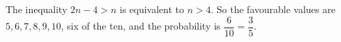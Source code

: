 The inequality $2n-4>n$ is equivalent to $n>4$. So the favourable values are $5,6,7,8,9,10$, six of the ten, and the probability is $\dfrac{6}{10}=\boxed{\dfrac{3}{5}}$.
